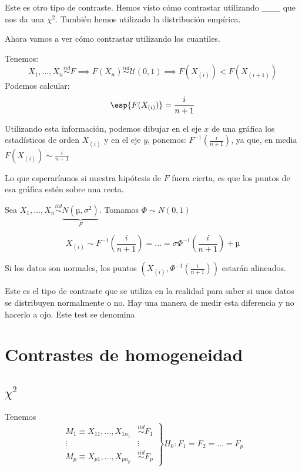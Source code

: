 Este es otro tipo de contraste. Hemos visto cómo contrastar utilizando \_\_\_ que nos da una $\chi^2$. También hemos utilizado la distribución empírica.

Ahora vamos a ver cómo contrastar utilizando los cuantiles.

Tenemos:
\[
X_1,...,X_n \overset{iid}{\sim} F \implies F(X_n) \overset{iid}{\sim}\mathcal{U}(0,1) \implies F(X_{(i)}) < F(X_{(i+1)})
\]
Podemos calcular:
\[\esp{F(X_{(i)})} = \frac{i}{n+1}\]


Utilizando esta información, podemos dibujar en el eje $x$ de una gráfica los estadísticos de orden $X_{(i)}$ y en el eje $y$, ponemos: $F^{-1}\left(\frac{i}{n+1}\right)$, ya que, en media $F(X_{(i)}) \sim \frac{i}{n+1}$

Lo que esperaríamos si nuestra hipótesis de $F$ fuera cierta, es que los puntos de esa gráfica estén sobre una recta.


\begin{example}
Sea $X_1,...,X_n \overset{iid}{\sim} \underbrace{N(µ,σ^2)}_{F}$. Tomamos $\Phi \sim N(0,1)$


\[X_{(i)} \sim F^{-1}\left(\frac{i}{n+1}\right) = ... = σ\Phi^{-1}\left(\frac{i}{n+1}\right) + µ\]

Si los datos son normales, los puntos $\left( X_{(i)},\Phi^{-1}\left(\frac{i}{n+1}\right)\right)$ estarán alineados.

\end{example}

\obs Este es el tipo de contraste que se utiliza en la realidad para saber si unos datos se distribuyen normalmente o no. Hay una manera de medir esta diferencia y no hacerlo a ojo. Este test se denomina 




\section{Contrastes de homogeneidad}
\subsection{$\chi^2$ }
Tenemos \[
\left.
\begin{array}{cc}
M_{1} \equiv X_{11} ,...,X_{1n_1} &\overset{iid}{\sim} F_1\\ 
\vdots & \vdots \\
M_{p} \equiv X_{p1} ,...,X_{pn_p} &\overset{iid}{\sim} F_p
\end{array} \right\} H_0 : F_1 = F_2 = ... = F_p 
\]

